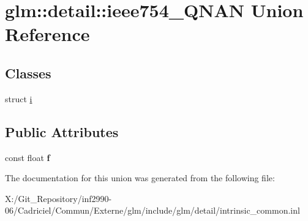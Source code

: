 \hypertarget{unionglm_1_1detail_1_1ieee754___q_n_a_n}{\section{glm\-:\-:detail\-:\-:ieee754\-\_\-\-Q\-N\-A\-N Union Reference}
\label{unionglm_1_1detail_1_1ieee754___q_n_a_n}
}
\subsection*{Classes}
\begin{DoxyCompactItemize}
\item 
struct \hyperlink{structglm_1_1detail_1_1ieee754___q_n_a_n_1_1i}{i}
\end{DoxyCompactItemize}
\subsection*{Public Attributes}
\begin{DoxyCompactItemize}
\item 
\hypertarget{unionglm_1_1detail_1_1ieee754___q_n_a_n_ac5f04f4e605e4d08ddc2bacddf7eee65}{const float {\bfseries f}}\label{unionglm_1_1detail_1_1ieee754___q_n_a_n_ac5f04f4e605e4d08ddc2bacddf7eee65}

\end{DoxyCompactItemize}


The documentation for this union was generated from the following file\-:\begin{DoxyCompactItemize}
\item 
X\-:/\-Git\-\_\-\-Repository/inf2990-\/06/\-Cadriciel/\-Commun/\-Externe/glm/include/glm/detail/intrinsic\-\_\-common.\-inl\end{DoxyCompactItemize}
